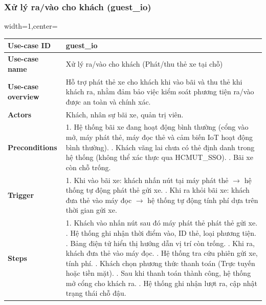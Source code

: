 \subsubsection{Xử lý ra/vào cho khách (guest\_io)}
\begin{adjustbox}{width=1\textwidth,center=\textwidth}
\small
\begin{tabular}{|>{\centering\arraybackslash}m{3.5cm}|m{13.2cm}|}
\hline
\textbf{Use-case ID} & guest\_io \\ \hline
\textbf{Use-case name} & Xử lý ra/vào cho khách (Phát/thu thẻ xe tại chỗ) \\ \hline
\textbf{Use-case overview} & Hỗ trợ phát thẻ xe cho khách khi vào bãi và thu thẻ khi khách ra, nhằm đảm bảo việc kiểm soát phương tiện ra/vào được an toàn và chính xác. \\ \hline
\textbf{Actors} & Khách, nhân sự bãi xe, quản trị viên. \\ \hline
\textbf{Preconditions} & 
1. Hệ thống bãi xe đang hoạt động bình thường (cổng vào mở, máy phát thẻ, máy đọc thẻ và cảm biến IoT hoạt động bình thường). \newline
2. Khách vãng lai chưa có thẻ định danh trong hệ thống (không thể xác thực qua HCMUT\_SSO). \newline
3. Bãi xe còn chỗ trống. \\ \hline
\textbf{Trigger} & 
1. Khi vào bãi xe: khách nhấn nút tại máy phát thẻ $\rightarrow$ hệ thống tự động phát thẻ gửi xe. \newline
2. Khi ra khỏi bãi xe: khách đưa thẻ vào máy đọc $\rightarrow$ hệ thống tự động tính phí dựa trên thời gian gửi xe. \\ \hline
\textbf{Steps} & 
1. Khách vào nhấn nút sau đó máy phát thẻ phát thẻ gửi xe. \newline
2. Hệ thống ghi nhận thời điểm vào, ID thẻ, loại phương tiện. \newline
3. Bảng điện tử hiển thị hướng dẫn vị trí còn trống. \newline
4. Khi ra, khách đưa thẻ vào máy đọc. \newline
5. Hệ thống tra cứu phiên gửi xe, tính phí. \newline
6. Khách chọn phương thức thanh toán (Trực tuyến hoặc tiền mặt). \newline
7. Sau khi thanh toán thành công, hệ thống mở cổng cho khách ra. \newline
8. Hệ thống ghi nhận lượt ra, cập nhật trạng thái chỗ đậu. \\ \hline
\end{tabular}
\end{adjustbox}

